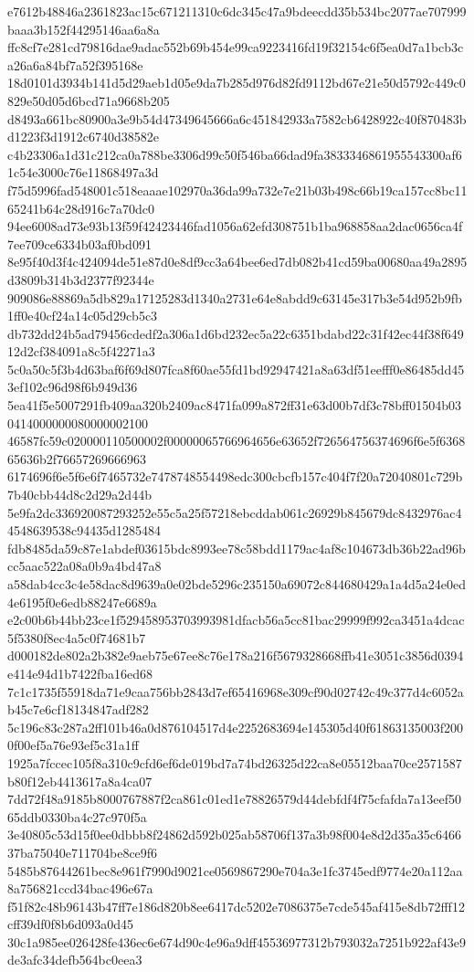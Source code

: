{e7612b48846a2361823ac15c671211310c6dc345c47a9bdeecdd35b534bc2077ae707999baaa3b152f44295146aa6a8a
ffc8cf7e281cd79816dae9adac552b69b454e99ca9223416fd19f32154c6f5ea0d7a1bcb3ca26a6a84bf7a52f395168e
18d0101d3934b141d5d29aeb1d05e9da7b285d976d82fd9112bd67e21e50d5792c449c0829e50d05d6bcd71a9668b205
d8493a661bc80900a3e9b54d47349645666a6c451842933a7582cb6428922c40f870483bd1223f3d1912c6740d38582e
c4b23306a1d31c212ca0a788be3306d99c50f546ba66dad9fa3833346861955543300af61c54e3000c76e11868497a3d
f75d5996fad548001c518eaaae102970a36da99a732e7e21b03b498c66b19ca157cc8bc1165241b64c28d916c7a70dc0
94ee6008ad73e93b13f59f42423446fad1056a62efd308751b1ba968858aa2dac0656ca4f7ee709ce6334b03af0bd091
8e95f40d3f4c424094de51e87d0e8df9cc3a64bee6ed7db082b41cd59ba00680aa49a2895d3809b314b3d2377f92344e
909086e88869a5db829a17125283d1340a2731e64e8abdd9c63145e317b3e54d952b9fb1ff0e40cf24a14c05d29cb5c3
db732dd24b5ad79456cdedf2a306a1d6bd232ec5a22c6351bdabd22c31f42ec44f38f64912d2cf384091a8c5f42271a3
5c0a50c5f3b4d63baf6f69d807fca8f60ae55fd1bd92947421a8a63df51eefff0e86485dd453ef102c96d98f6b949d36
5ea41f5e5007291fb409aa320b2409ac8471fa099a872ff31e63d00b7df3c78bff01504b030414000000080000002100
46587fc59c020000110500002f00000065766964656e63652f726564756374696f6e5f636865636b2f76657269666963
6174696f6e5f6e6f7465732e7478748554498edc300cbcfb157c404f7f20a72040801c729b7b40cbb44d8c2d29a2d44b
5e9fa2dc336920087293252e55c5a25f57218ebcddab061c26929b845679dc8432976ac44548639538c94435d1285484
fdb8485da59c87e1abdef03615bdc8993ee78c58bdd1179ac4af8c104673db36b22ad96bcc5aac522a08a0b9a4bd47a8
a58dab4cc3c4e58dac8d9639a0e02bde5296c235150a69072c844680429a1a4d5a24e0ed4e6195f0e6edb88247e6689a
e2c00b6b44bb23ce1f529458953703993981dfacb56a5cc81bac29999f992ca3451a4dcac5f5380f8ec4a5c0f74681b7
d000182de802a2b382e9aeb75e67ee8c76e178a216f5679328668ffb41e3051c3856d0394e414e94d1b7422fba16ed68
7c1c1735f55918da71e9caa756bb2843d7ef65416968e309cf90d02742c49c377d4c6052ab45c7e6cf18134847adf282
5c196c83c287a2ff101b46a0d876104517d4e2252683694e145305d40f61863135003f2000f00ef5a76e93ef5c31a1ff
1925a7fccec105f8a310c9cfd6ef6de019bd7a74bd26325d22ca8e05512baa70ce2571587b80f12eb4413617a8a4ca07
7dd72f48a9185b8000767887f2ca861c01ed1e78826579d44debfdf4f75cfafda7a13eef5065ddb0330ba4c27c970f5a
3e40805c53d15f0ee0dbbb8f24862d592b025ab58706f137a3b98f004e8d2d35a35c646637ba75040e711704be8ce9f6
5485b87644261bec8e961f7990d9021ce0569867290e704a3e1fc3745edf9774e20a112aa8a756821ccd34bac496e67a
f51f82c48b96143b47ff7e186d820b8ee6417dc5202e7086375e7cde545af415e8db72fff12cff39df0f8b6d093a0d45
30c1a985ee026428fe436ec6e674d90c4e96a9dff45536977312b793032a7251b922af43e9de3afc34defb564bc0eea3
}
